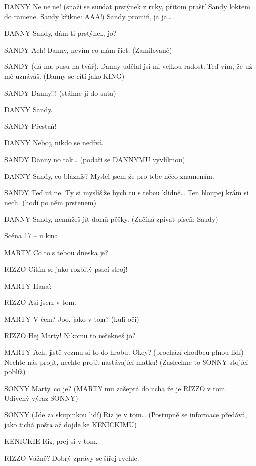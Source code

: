 DANNY        Ne ne ne! (snaží se sundat prstýnek z ruky, přitom praští Sandy loktem         do ramene. Sandy křikne: AAA!) Sandy promiň, ja ja…

DANNY        Sandy, dám ti prstýnek, jo?

SANDY        Ach! Danny, nevím co mám říct. (Zamilovaně)

SANDY        (dá mu pusu na tvář). Danny udělal jsi mi velkou radost. Teď vím, že už mě uznáváš. (Danny se cítí jako KING)

SANDY        Danny!!! (stáhne ji do auta)

DANNY        Sandy. 

SANDY        Přestaň!

DANNY        Neboj, nikdo se nedívá. 

SANDY        Danny no tak… (podaří se DANNYMU vyvlíknou)

DANNY        Sandy, co blázníš? Myslel jsem že pro tebe něco znamenám. 

SANDY        Teď už ne. Ty si myslíš že bych tu s tebou klidně… Ten hloupej krám si         nech. (hodí po něm prstenem)

DANNY        Sandy, nemůžeš jít domů pěšky. (Začíná zpívat píseň: Sandy)





 Scéna 17  – u kina 

MARTY        Co to s tebou dneska je?

RIZZO        Cítím se jako rozbitý psací stroj! 

MARTY        Haaa?

RIZZO        Asi jsem v tom.

MARTY        V čem? Joo, jako  v tom? (kulí oči)

RIZZO        Hej Marty! Nikomu to neřekneš jo?

MARTY        Ach, jistě vezmu si to do hrobu. Okey? (prochází chodbou plnou lidí)         Nechte nás projít, nechte projít nastávající matku! (Zaslechne to         SONNY stojící poblíž)

SONNY        Marty, co je? (MARTY mu zašeptá do ucha že je RIZZO v tom. Udivený         výraz SONNY) 

SONNY        (Jde za skupinkou lidí) Riz je v tom… (Postupně se informace předává,         jako tichá pošta až dojde ke KENICKIMU)

KENICKIE        Riz, prej si v tom.

RIZZO        Vážně? Dobrý zprávy se šířej rychle.

